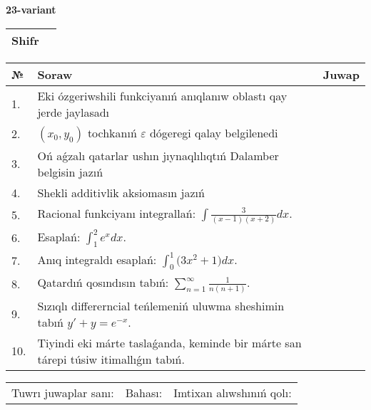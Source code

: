 \documentclass{article}
\begin{document}
  \egroup
  
  \newpage
  
  
  \textbf{23-variant}\\
  
  \bgroup
  \def\arraystretch{1.6} %
  
  \begin{tabular}{|m{5.7cm}|m{9.5cm}|}
  \hline
  Shifr & \\
  \hline
  \end{tabular}
  
  \vspace{1cm}
  
  \begin{tabular}{|m{0.7cm}|m{10cm}|m{4cm}|}
  \hline
  № & Soraw & Juwap \\
  \hline
  1. & Eki ózgeriwshili funkciyanıń anıqlanıw oblastı qay jerde jaylasadı &  \\
  \hline
  2. & \((x_0,y_0)\) tochkanıń \(\varepsilon\) dógeregi qalay belgilenedi &  \\
  \hline
  3. & Oń aǵzalı qatarlar ushın jıynaqlılıqtıń Dalamber belgisin jazıń &  \\
  \hline
  4. & Shekli additivlik aksiomasın jazıń &  \\
  \hline
  5. & Racional funkciyanı integrallań: \(\int{\frac{3}{(x - 1)(x + 2)}dx}\). &  \\
  \hline
  6. & Esaplań: \(\int_{1}^2 {e^{x}dx}\). &  \\
  \hline
  7. & Anıq integraldı esaplań: \(\int_{0}^{1}{(3x^2 } + 1)dx\). &  \\
  \hline
  8. & Qatardıń qosındısın tabıń: \(\sum_{n = 1}^{\infty}\frac{1}{n(n + 1)}\). &  \\
  \hline
  9. & Sızıqlı differerncial teńlemeniń uluwma sheshimin tabıń \(y' + y = e^{- x}\). &  \\
  \hline
  10. & Tiyindi eki márte taslaǵanda, keminde bir márte san tárepi túsiw itimallıǵın tabıń. &  \\
  \hline
  \end{tabular}
  
  \vspace{1cm}
  
  \begin{tabular}{lll}
  Tuwrı juwaplar sanı: \underline{\hspace{1.5cm}} & 
  Bahası: \underline{\hspace{1.5cm}} & 
  Imtixan alıwshınıń qolı: \underline{\hspace{2cm}} \\
  \end{tabular}
  
\end{document}
